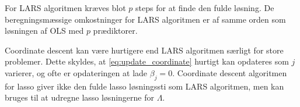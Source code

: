 
For LARS algoritmen kræves blot \(p\) steps for at finde den fulde løsning.
De beregningsmæssige omkostninger for LARS algoritmen er af samme orden som løsningen af OLS med \(p\) prædiktorer.

Coordinate descent kan være hurtigere end LARS algoritmen særligt for store problemer.
Dette skyldes, at \eqref{eq:update_coordinate} hurtigt kan opdateres som \(j\) varierer, og ofte er opdateringen at lade \(\beta_j = 0\).
Coordinate descent algoritmen for lasso giver ikke den fulde lasso løsningssti som LARS algoritmen, men kan bruges til at udregne lasso løsningerne for \(\Lambda\).




